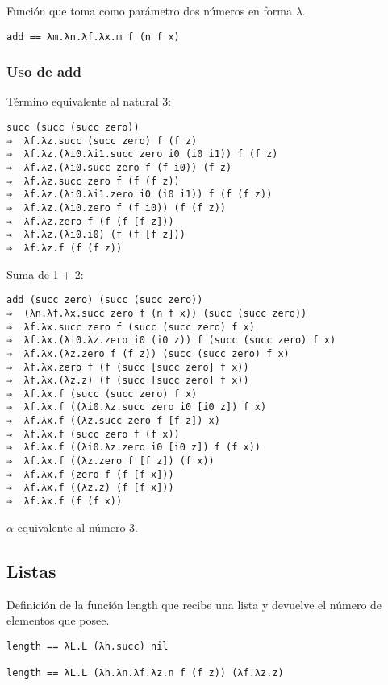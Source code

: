 \documentclass[11pt, spanish]{scrartcl}
\numberwithin{equation}{section} %
\numberwithin{figure}{section} %
\numberwithin{table}{section} %
\begin{document}
Función que toma como parámetro dos números en forma \( \lambda \).
\begin{lstlisting}[language=Lambda]
add == λm.λn.λf.λx.m f (n f x)
\end{lstlisting}

\subsubsection{Uso de add}

Término equivalente al natural 3:
\begin{lstlisting}[language=Lambda]
succ (succ (succ zero))
⇒  λf.λz.succ (succ zero) f (f z)
⇒  λf.λz.(λi0.λi1.succ zero i0 (i0 i1)) f (f z)
⇒  λf.λz.(λi0.succ zero f (f i0)) (f z)
⇒  λf.λz.succ zero f (f (f z))
⇒  λf.λz.(λi0.λi1.zero i0 (i0 i1)) f (f (f z))
⇒  λf.λz.(λi0.zero f (f i0)) (f (f z))
⇒  λf.λz.zero f (f (f [f z]))
⇒  λf.λz.(λi0.i0) (f (f [f z]))
⇒  λf.λz.f (f (f z))
\end{lstlisting}

Suma de 1 + 2:
\begin{lstlisting}[language=Lambda]
add (succ zero) (succ (succ zero))
⇒  (λn.λf.λx.succ zero f (n f x)) (succ (succ zero))
⇒  λf.λx.succ zero f (succ (succ zero) f x)
⇒  λf.λx.(λi0.λz.zero i0 (i0 z)) f (succ (succ zero) f x)
⇒  λf.λx.(λz.zero f (f z)) (succ (succ zero) f x)
⇒  λf.λx.zero f (f (succ [succ zero] f x))
⇒  λf.λx.(λz.z) (f (succ [succ zero] f x))
⇒  λf.λx.f (succ (succ zero) f x)
⇒  λf.λx.f ((λi0.λz.succ zero i0 [i0 z]) f x)
⇒  λf.λx.f ((λz.succ zero f [f z]) x)
⇒  λf.λx.f (succ zero f (f x))
⇒  λf.λx.f ((λi0.λz.zero i0 [i0 z]) f (f x))
⇒  λf.λx.f ((λz.zero f [f z]) (f x))
⇒  λf.λx.f (zero f (f [f x]))
⇒  λf.λx.f ((λz.z) (f [f x]))
⇒  λf.λx.f (f (f x))
\end{lstlisting}

\( \alpha \)-equivalente al número 3.

\newpage


\subsection{Listas}

Definición de la función length que recibe una lista y devuelve el número de elementos que 
posee.
\begin{lstlisting}[language=Lambda]
length == λL.L (λh.succ) nil

length == λL.L (λh.λn.λf.λz.n f (f z)) (λf.λz.z)
\end{lstlisting}
\end{document}
